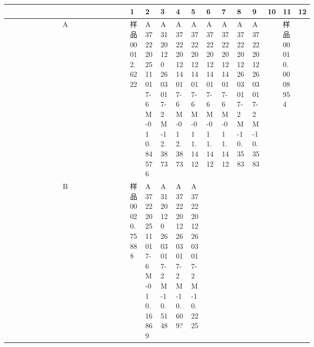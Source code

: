 \documentclass[UTF8,10pt,a4paper,fontset=fandol]{ctexart}
\begin{document}
\begin{center}
\tiny
\begin{tabular}{c|p{0.058\linewidth}|p{0.058\linewidth}|p{0.058\linewidth}|p{0.058\linewidth}|p{0.058\linewidth}|p{0.058\linewidth}|p{0.058\linewidth}|p{0.058\linewidth}|p{0.058\linewidth}|p{0.058\linewidth}|p{0.058\linewidth}|p{0.058\linewidth}}
 & 1 & 2 & 3 & 4 & 5 & 6 & 7 & 8 & 9 & 10 & 11 & 12\\ \hline
A &
\parbox[t]{0.058\linewidth}{\raggedright 样品0001\\2.6222} &
\parbox[t]{0.058\linewidth}{\raggedright A37222025\\11017-6M-01\\0.84576} &
\parbox[t]{0.058\linewidth}{\raggedright A3120120\\2603017-2M-1\\2.3873} &
\parbox[t]{0.058\linewidth}{\raggedright A37222012\\14017-6M-01\\2.3873} &
\parbox[t]{0.058\linewidth}{\raggedright A37222012\\14017-6M-01\\1.1412} &
\parbox[t]{0.058\linewidth}{\raggedright A37222012\\14017-6M-01\\1.1412} &
\parbox[t]{0.058\linewidth}{\raggedright A37222012\\14017-6M-01\\1.1412} &
\parbox[t]{0.058\linewidth}{\raggedright A37222012\\2603017-2M-1\\0.3583} &
\parbox[t]{0.058\linewidth}{\raggedright A37222012\\2603017-2M-1\\0.3583} &
 & \parbox[t]{0.058\linewidth}{\raggedright 样品0001\\0.0008954} & \\ \hline
B &
\parbox[t]{0.058\linewidth}{\raggedright 样品0002\\0.75888} &
\parbox[t]{0.058\linewidth}{\raggedright A37222025\\11017-6M-01\\0.16869} &
\parbox[t]{0.058\linewidth}{\raggedright A3120120\\2603017-2M-1\\0.5148} &
\parbox[t]{0.058\linewidth}{\raggedright A37222012\\2603017-2M-1\\0.609?} &
\parbox[t]{0.058\linewidth}{\raggedright A37222012\\2603017-2M-1\\0.2225} &

\end{tabular}
\end{center}
\end{document}
